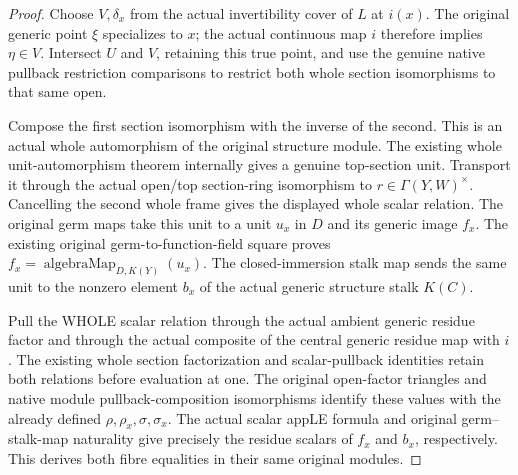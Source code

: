 \begin{proof}
Choose $V,\delta_x$ from the actual invertibility cover of $L$ at $i(x)$.
The original generic point $\xi$ specializes to $x$; the actual continuous
map $i$ therefore implies $\eta\in V$. Intersect $U$ and $V$, retaining
this true point, and use the genuine native pullback restriction comparisons
to restrict both whole section isomorphisms to that same open.

Compose the first section isomorphism with the inverse of the second.
This is an actual whole automorphism of the original structure module.
The existing whole unit-automorphism theorem internally gives a genuine
top-section unit. Transport it through the actual open/top section-ring
isomorphism to $r\in\Gamma(Y,W)^\times$. Cancelling the second whole frame
gives the displayed whole scalar relation. The original germ maps take
this unit to a unit $u_x$ in $D$ and its generic image $f_x$. The existing
original germ-to-function-field square proves
$f_x=\operatorname{algebraMap}_{D,K(Y)}(u_x)$. The closed-immersion stalk map
sends the same unit to the nonzero element $b_x$ of the actual generic
structure stalk $K(C)$.

Pull the WHOLE scalar relation through the actual ambient generic residue
factor and through the actual composite of the central generic residue map
with $i$. The existing whole section factorization and scalar-pullback
identities retain both relations before evaluation at one. The original
open-factor triangles and native module pullback-composition isomorphisms
identify these values with the already defined $\rho,\rho_x,\sigma,\sigma_x$.
The actual scalar appLE formula and original germ--stalk-map naturality give
precisely the residue scalars of $f_x$ and $b_x$, respectively. This derives
both fibre equalities in their same original modules.
\end{proof}

